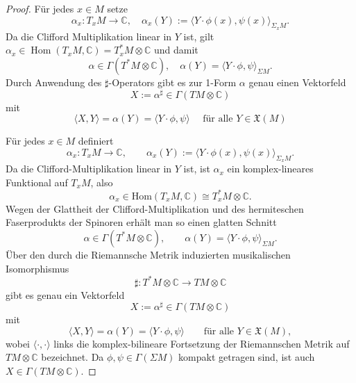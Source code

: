 \documentclass[10pt, letterpaper]{article}
\newcommand{\Hom}{\mathrm{Hom}}
\begin{document}
\begin{proof}
  Für jedes $x \in M$ setze
  $$
  \alpha_x: T_x M \rightarrow \mathbb{C}, \quad \alpha_x(Y):=\langle Y \cdot \phi(x), \psi(x)\rangle_{\Sigma_xM} .
  $$
  Da die Clifford Multiplikation linear in $Y$ ist, gilt
  $\alpha_x \in \operatorname{Hom}\left(T_x M, \mathbb{C}\right)=T_x^* M \otimes \mathbb{C}$ und damit
  $$\alpha \in \Gamma(T^* M \otimes \mathbb{C}), \quad \alpha(Y)=\langle Y \cdot \phi, \psi\rangle_{\Sigma M}.$$
  Durch Anwendung des $\sharp$-Operators gibt es zur 1-Form $\alpha$ genau einen Vektorfeld
  $$
  X:=\alpha^{\sharp} \in \Gamma(T M \otimes \mathbb{C})
  $$
  mit
  $$
  \langle X,Y\rangle =\alpha(Y)=\langle Y \cdot \phi, \psi\rangle \quad \text { für alle } Y \in \mathfrak{X}(M)
  $$




  Für jedes $x\in M$ definiert
\[
\alpha_x:T_xM\to\mathbb C,\qquad
\alpha_x(Y):=\langle Y\cdot\phi(x),\psi(x)\rangle_{\Sigma_xM}.
\]
Da die Clifford-Multiplikation linear in $Y$ ist, ist $\alpha_x$ ein
komplex-lineares Funktional auf $T_xM$, also
\[
\alpha_x\in \Hom(T_xM,\mathbb C)\cong T_x^*M\otimes\mathbb C.
\]
Wegen der Glattheit der Clifford-Multiplikation und des hermiteschen
Faserprodukts der Spinoren erhält man so einen glatten Schnitt
\[
\alpha\in \Gamma(T^*M\otimes\mathbb C),\qquad
\alpha(Y)=\langle Y\cdot\phi,\psi\rangle_{\Sigma M}.
\]
Über den durch die Riemannsche Metrik induzierten musikalischen Isomorphismus
\[
\sharp:T^*M\otimes\mathbb C\to TM\otimes\mathbb C
\]
gibt es genau ein Vektorfeld
\[
X:=\alpha^\sharp\in \Gamma(TM\otimes\mathbb C)
\]
mit
\[
\langle X,Y\rangle=\alpha(Y)=\langle Y\cdot\phi,\psi\rangle
\qquad\text{für alle }Y\in \mathfrak X(M),
\]
wobei $\langle\cdot,\cdot\rangle$ links die komplex-bilineare Fortsetzung der
Riemannschen Metrik auf $TM\otimes\mathbb C$ bezeichnet.
Da $\phi,\psi\in \Gamma(\Sigma M)$ kompakt getragen sind, ist auch
$X\in \Gamma(TM\otimes\mathbb C)$.


\end{proof}
\end{document}
